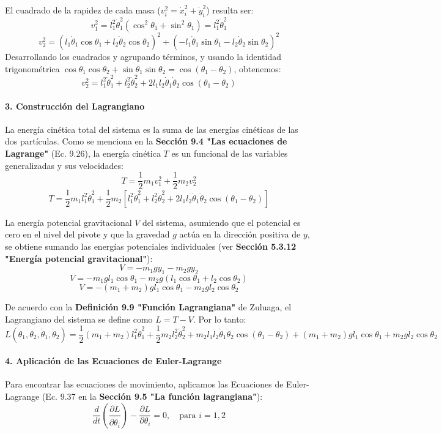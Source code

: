 \documentclass[a4paper]{article}
\begin{document}
El cuadrado de la rapidez de cada masa ($v_i^2 = \dot{x}_i^2 + \dot{y}_i^2$) resulta ser:
$$v_1^2 = l_1^2 \dot{\theta}_1^2 (\cos^2\theta_1 + \sin^2\theta_1) = l_1^2 \dot{\theta}_1^2$$
$$v_2^2 = (l_1 \dot{\theta}_1 \cos\theta_1 + l_2 \dot{\theta}_2 \cos\theta_2)^2 + (-l_1 \dot{\theta}_1 \sin\theta_1 - l_2 \dot{\theta}_2 \sin\theta_2)^2$$
Desarrollando los cuadrados y agrupando términos, y usando la identidad trigonométrica $\cos\theta_1 \cos\theta_2 + \sin\theta_1 \sin\theta_2 = \cos(\theta_1 - \theta_2)$, obtenemos:
$$v_2^2 = l_1^2 \dot{\theta}_1^2 + l_2^2 \dot{\theta}_2^2 + 2 l_1 l_2 \dot{\theta}_1 \dot{\theta}_2 \cos(\theta_1 - \theta_2)$$

\paragraph{3. Construcción del Lagrangiano}
La energía cinética total del sistema es la suma de las energías cinéticas de las dos partículas. Como se menciona en la \textbf{Sección 9.4 "Las ecuaciones de Lagrange"} (Ec. 9.26), la energía cinética $T$ es un funcional de las variables generalizadas y sus velocidades:
$$T = \frac{1}{2}m_1 v_1^2 + \frac{1}{2}m_2 v_2^2$$
$$T = \frac{1}{2}m_1 l_1^2 \dot{\theta}_1^2 + \frac{1}{2}m_2 \left[ l_1^2 \dot{\theta}_1^2 + l_2^2 \dot{\theta}_2^2 + 2 l_1 l_2 \dot{\theta}_1 \dot{\theta}_2 \cos(\theta_1 - \theta_2) \right]$$

La energía potencial gravitacional $V$ del sistema, asumiendo que el potencial es cero en el nivel del pivote y que la gravedad $g$ actúa en la dirección positiva de $y$, se obtiene sumando las energías potenciales individuales (ver \textbf{Sección 5.3.12 "Energía potencial gravitacional"}):
$$V = -m_1 g y_1 - m_2 g y_2$$
$$V = -m_1 g l_1 \cos\theta_1 - m_2 g (l_1 \cos\theta_1 + l_2 \cos\theta_2)$$
$$V = -(m_1 + m_2) g l_1 \cos\theta_1 - m_2 g l_2 \cos\theta_2$$

De acuerdo con la \textbf{Definición 9.9 "Función Lagrangiana"} de Zuluaga, el Lagrangiano del sistema se define como $L = T - V$. Por lo tanto:
$$L(\theta_1, \theta_2, \dot{\theta}_1, \dot{\theta}_2) = \frac{1}{2}(m_1 + m_2) l_1^2 \dot{\theta}_1^2 + \frac{1}{2}m_2 l_2^2 \dot{\theta}_2^2 + m_2 l_1 l_2 \dot{\theta}_1 \dot{\theta}_2 \cos(\theta_1 - \theta_2) + (m_1 + m_2) g l_1 \cos\theta_1 + m_2 g l_2 \cos\theta_2$$

\paragraph{4. Aplicación de las Ecuaciones de Euler-Lagrange}
Para encontrar las ecuaciones de movimiento, aplicamos las Ecuaciones de Euler-Lagrange (Ec. 9.37 en la \textbf{Sección 9.5 "La función lagrangiana"}):
$$\frac{d}{dt}\left(\frac{\partial L}{\partial \dot{\theta}_i}\right) - \frac{\partial L}{\partial \theta_i} = 0, \quad \text{para } i = 1, 2$$
\end{document}

